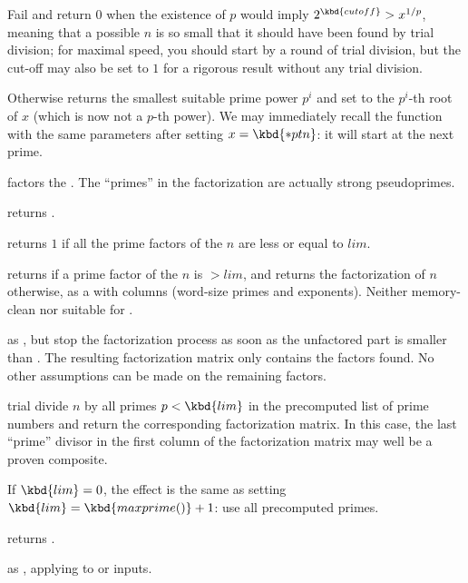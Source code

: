 Fail and return $0$ when the existence of $p$ would imply $2^{\kbd{cutoff}} >
x^{1/p}$, meaning that a possible $n$ is so small that it should have been
found by trial division; for maximal speed, you should start by a round of
trial division, but the cut-off may also be set to $1$ for a rigorous result
without any trial division.

Otherwise returns the smallest suitable prime power $p^i$ and set 
to the $p^i$-th root of $x$ (which is now not a $p$-th power). We may
immediately recall the function with the same parameters after setting $x =
\kbd{*ptn}$: it will start at the next prime.


 factors the  . The ``primes''
in the factorization are actually strong pseudoprimes.

 returns .

 returns $1$ if all the
prime factors of the  $n$ are less or equal to $lim$.

 returns  if a prime
factor of the  $n$ is $> lim$, and returns the factorization
of $n$ otherwise, as a  with  columns (word-size
primes and exponents). Neither memory-clean nor suitable for
.

 as , but stop the
factorization process as soon as the unfactored part is smaller than .
The resulting factorization matrix only contains the factors found. No other
assumptions can be made on the remaining factors.

 trial divide $n$ by all primes $p
< \kbd{lim}$ in the precomputed list of prime numbers and return the
corresponding factorization matrix. In this case, the last ``prime'' divisor
in the first column of the factorization matrix may well be a proven
composite.

If $\kbd{lim} = 0$, the effect is the same as setting $\kbd{lim} =
\kbd{maxprime()} + 1$: use all precomputed primes.

returns
.

 as , applying to
 or  inputs.

